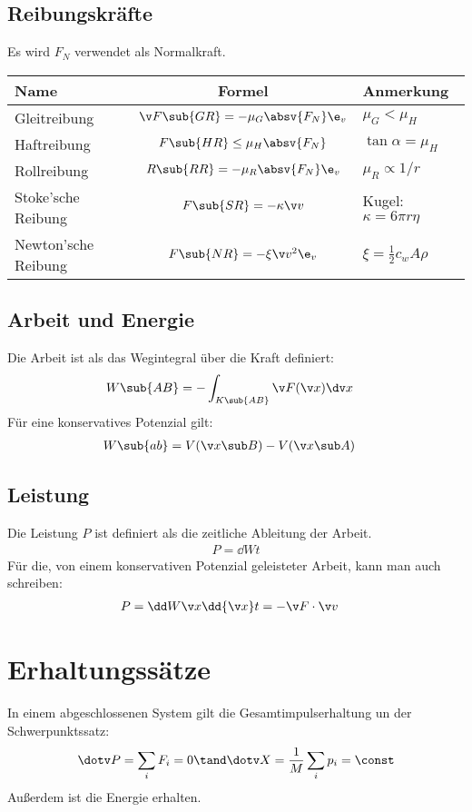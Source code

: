 \documentclass[twocolumn, bfvec]{summery_5.0}
\begin{document}
\subsection{Reibungskräfte}
Es wird $F_N$ verwendet als Normalkraft.
\begin{table}[H]
\begin{tabular}{@{}l c l @{}}
    \toprule
    Name & Formel & Anmerkung\\
    \midrule
    Gleitreibung & \(\v F\sub{GR}=-\mu_G \absv{F_N} \e_v\) & $\mu_G<\mu_H$\\
    Haftreibung & \(F\sub{HR} \le \mu_H \absv{F_N}\) & $\tan\alpha = \mu_H$\\
    Rollreibung & \(R\sub{RR} = - \mu_R \absv{F_N} \e_v\) & $\mu_R \propto 1/r$\\
    Stoke'sche Reibung & \(F\sub{SR} = - \kappa \v v\) & Kugel: \(\kappa = 6\pi r \eta\)\\
    Newton'sche Reibung & \(F\sub{NR} = -\xi \v v^2 \e_v\) & \(\xi =\frac12 c_w A \rho\)\\
    \bottomrule
\end{tabular}
\end{table}

\subsection{Arbeit und Energie}
Die Arbeit ist als das Wegintegral über die Kraft definiert:
\begin{align*}
    W\sub{AB} &= - \int_{K\sub{AB}} \v F(\v x) \dv x
\end{align*}
Für eine konservatives Potenzial gilt:
\begin{align*}
    W\sub{ab} &= V(\v x\sub B) - V(\v x\sub A)
\end{align*}

\subsection{Leistung}
Die Leistung $P$ ist definiert als die zeitliche Ableitung der Arbeit.
\begin{align*}
    P = \dd Wt
\end{align*}
Für die, von einem konservativen Potenzial geleisteter Arbeit, kann man auch schreiben:
\begin{align*}
    P = \dd W{\v x} \dd{\v x} t &= - \v F \cdot \v v 
\end{align*}

\section{Erhaltungssätze}
In einem abgeschlossenen System gilt die Gesamtimpulserhaltung un der Schwerpunktssatz:
\begin{align*}
    \dotv P = \sum_i F_i = 0 \tand \dotv X = \frac1M \sum_i p_i = \const 
\end{align*}
Außerdem ist die Energie erhalten. 
\end{document}
